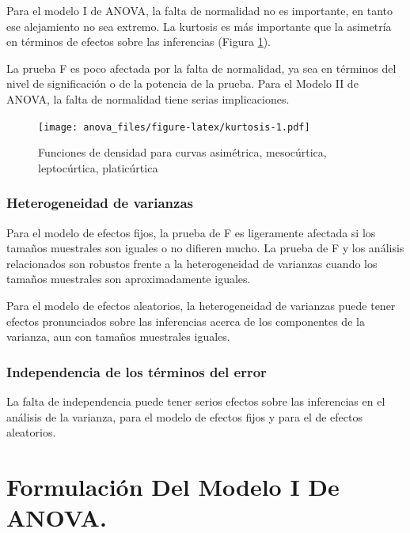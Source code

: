 \documentclass[]{book}
\theoremstyle{definition}
\theoremstyle{definition}
\theoremstyle{definition}
\theoremstyle{remark}
\begin{document}
Para el modelo I de ANOVA, la falta de normalidad no es importante, en
tanto ese alejamiento no sea extremo. La kurtosis es más importante que
la asimetría en términos de efectos sobre las inferencias (Figura
\ref{fig:kurtosis}).

La prueba F es poco afectada por la falta de normalidad, ya sea en
términos del nivel de significación o de la potencia de la prueba. Para
el Modelo II de ANOVA, la falta de normalidad tiene serias
implicaciones.

\begin{figure}
\centering
\texttt{[image: anova\_files/figure-latex/kurtosis-1.pdf]}
\caption{\label{fig:kurtosis}Funciones de densidad para curvas asimétrica,
mesocúrtica, leptocúrtica, platicúrtica}
\end{figure}

\hypertarget{heterogeneidad-de-varianzas}{%
\subsubsection{Heterogeneidad de
varianzas}\label{heterogeneidad-de-varianzas}}

Para el modelo de efectos fijos, la prueba de F es ligeramente afectada
si los tamaños muestrales son iguales o no difieren mucho. La prueba de
F y los análisis relacionados son robustos frente a la heterogeneidad de
varianzas cuando los tamaños muestrales son aproximadamente iguales.

Para el modelo de efectos aleatorios, la heterogeneidad de varianzas
puede tener efectos pronunciados sobre las inferencias acerca de los
componentes de la varianza, aun con tamaños muestrales iguales.

\hypertarget{independencia-de-los-terminos-del-error}{%
\subsubsection{Independencia de los términos del
error}\label{independencia-de-los-terminos-del-error}}

La falta de independencia puede tener serios efectos sobre las
inferencias en el análisis de la varianza, para el modelo de efectos
fijos y para el de efectos aleatorios.

\hypertarget{formulacion-del-modelo-i-de-anova.}{%
\section{Formulación Del Modelo I De
ANOVA.}\label{formulacion-del-modelo-i-de-anova.}}
\end{document}
